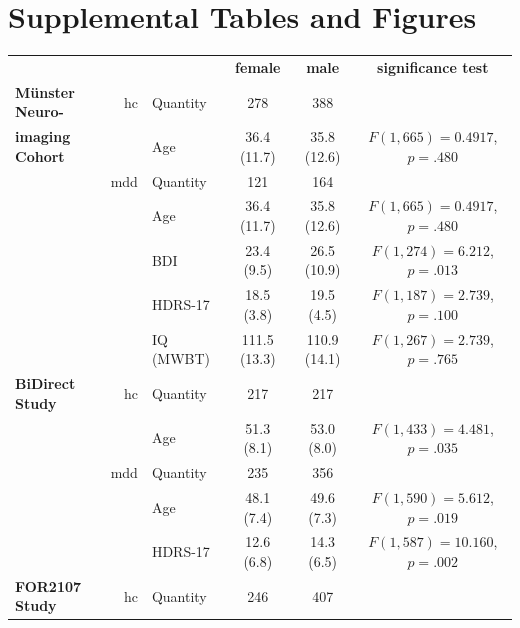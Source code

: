 \documentclass{article}
\begin{document}
    \setcounter{equation}{1}
    \setcounter{figure}{0}
    \setcounter{table}{0}
    \setcounter{page}{1}

    \renewcommand\thefigure{\thesection.\arabic{figure}}
    \renewcommand\thetable{\thesection.\arabic{table}}


    \section{Supplemental Tables and Figures}
    \begin{table}[ht]
        \renewcommand{\arraystretch}{1.5}
        \begin{center}
            \begin{tabular}{lr|lccc}
                \multicolumn{3}{c}{} & {\textbf{female}} & {\textbf{male}} & {\textbf{significance test}} \\ \cline{2-6}
                \textbf{Münster Neuro-} & \acs{hc} & Quantity  & 278          & 388          &                             \\
                \textbf{imaging Cohort} &          & Age       & 36.4 (11.7)  & 35.8 (12.6)  & $F(1,665)=0.4917$, $p=.480$ \\ \cline{3-6}
                & \acs{mdd} & Quantity & 121 & 164 \\
                &          & Age       & 36.4 (11.7)  & 35.8 (12.6)  & $F(1,665)=0.4917$, $p=.480$ \\
                &          & BDI       & 23.4 (9.5)   & 26.5 (10.9)  & $F(1,274)=6.212$, $p=.013$  \\
                &          & HDRS-17   & 18.5 (3.8)   & 19.5 (4.5)   & $F(1,187)=2.739$, $p=.100$  \\
                &          & IQ (MWBT) & 111.5 (13.3) & 110.9 (14.1) & $F(1,267)=2.739$, $p=.765$  \\  \cline{2-6}
                \textbf{BiDirect Study} & \acs{hc} & Quantity & 217 & 217 \\
                &          & Age       & 51.3 (8.1)   & 53.0 (8.0)   & $F(1,433)=4.481$, $p=.035$  \\ \cline{3-6}
                & \acs{mdd} & Quantity & 235 & 356 \\
                &          & Age       & 48.1 (7.4)   & 49.6 (7.3)   & $F(1,590)=5.612$,  $p=.019$   \\
                &          & HDRS-17   & 12.6 (6.8)   & 14.3 (6.5)   & $F(1,587)=10.160$, $p=.002$ \\ \cline{2-6}
                \textbf{FOR2107 Study} & \acs{hc} & Quantity & 246 & 407 \\

\end{tabular}
\end{center}
\end{table}
\end{document}
